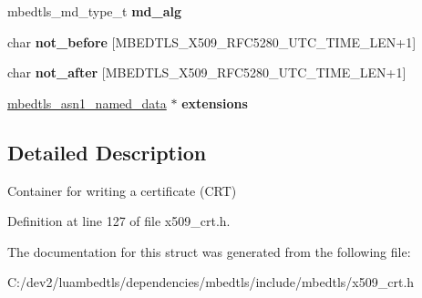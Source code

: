 \begin{DoxyCompactItemize}
\item 
\hypertarget{structmbedtls__x509write__cert_a2f6f4b15724665cb69f09721a6993a14}{mbedtls\-\_\-md\-\_\-type\-\_\-t {\bfseries md\-\_\-alg}}\label{structmbedtls__x509write__cert_a2f6f4b15724665cb69f09721a6993a14}

\item 
\hypertarget{structmbedtls__x509write__cert_ad6949fe534892489aae6120930608674}{char {\bfseries not\-\_\-before} \mbox{[}M\-B\-E\-D\-T\-L\-S\-\_\-\-X509\-\_\-\-R\-F\-C5280\-\_\-\-U\-T\-C\-\_\-\-T\-I\-M\-E\-\_\-\-L\-E\-N+1\mbox{]}}\label{structmbedtls__x509write__cert_ad6949fe534892489aae6120930608674}

\item 
\hypertarget{structmbedtls__x509write__cert_a6cd1ad303fa276aa04f9ff3eac02cc99}{char {\bfseries not\-\_\-after} \mbox{[}M\-B\-E\-D\-T\-L\-S\-\_\-\-X509\-\_\-\-R\-F\-C5280\-\_\-\-U\-T\-C\-\_\-\-T\-I\-M\-E\-\_\-\-L\-E\-N+1\mbox{]}}\label{structmbedtls__x509write__cert_a6cd1ad303fa276aa04f9ff3eac02cc99}

\item 
\hypertarget{structmbedtls__x509write__cert_aca0adbd990adfc83ebb27b7333590a5c}{\hyperlink{structmbedtls__asn1__named__data}{mbedtls\-\_\-asn1\-\_\-named\-\_\-data} $\ast$ {\bfseries extensions}}\label{structmbedtls__x509write__cert_aca0adbd990adfc83ebb27b7333590a5c}

\end{DoxyCompactItemize}


\subsection{Detailed Description}
Container for writing a certificate (C\-R\-T) 

Definition at line 127 of file x509\-\_\-crt.\-h.



The documentation for this struct was generated from the following file\-:\begin{DoxyCompactItemize}
\item 
C\-:/dev2/luambedtls/dependencies/mbedtls/include/mbedtls/x509\-\_\-crt.\-h\end{DoxyCompactItemize}
